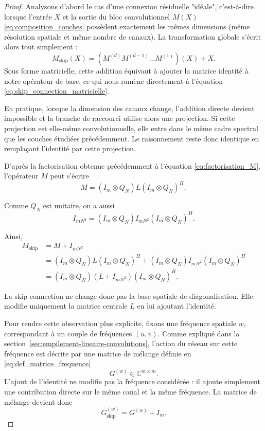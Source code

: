 \begin{proof}

Analysons d'abord le cas d'une connexion résiduelle "idéale", c'est-à-dire lorsque l'entrée $X$ et la sortie 
du bloc convolutionnel $M(X)$ \eqref{eq:composition_couches} possèdent exactement les mêmes dimensions (même résolution spatiale et même nombre 
de canaux). La transformation globale s'écrit alors tout simplement :
$$
M_{\mathrm{skip}}(X) = (M^{(d)} M^{(d-1)} \dots M^{(1)})(X) + X.
$$
Sous forme matricielle, cette addition équivaut à ajouter la matrice identité à notre opérateur de base, 
ce qui nous ramène directement à l'équation \eqref{eq:skip_connection_matricielle}.

En pratique, lorsque la dimension des canaux change, l'addition directe devient impossible et la 
branche de raccourci utilise alors une projection. 
Si cette projection est elle-même convolutionnelle, elle entre dans le même cadre spectral que les couches
étudiées précédemment. Le raisonnement reste donc identique en remplaçant l'identité par cette projection.

D'après la factorisation obtenue précédemment à l'équation \eqref{eq:factorisation_M}, l'opérateur $M$ peut
s'écrire
\[
M = (I_m \otimes Q_N)L(I_m \otimes Q_N)^H,
\]

Comme $Q_N$ est unitaire, on a aussi
\[
I_{mN^2}
=
(I_m \otimes Q_N)I_{mN^2}(I_m \otimes Q_N)^H.
\]

Ainsi,
\begin{align*}
M_{\mathrm{skip}}
&= M + I_{mN^2} \\
&= (I_m \otimes Q_N)L(I_m \otimes Q_N)^H
+
(I_m \otimes Q_N)I_{mN^2}(I_m \otimes Q_N)^H \\
&= (I_m \otimes Q_N)(L + I_{mN^2})(I_m \otimes Q_N)^H.
\end{align*}

La skip connection ne change donc pas la base spatiale de diagonalisation. Elle modifie uniquement la matrice
centrale $L$ en lui ajoutant l'identité.

Pour rendre cette observation plus explicite, fixons une fréquence spatiale $w$, correspondant à un couple
de fréquences $(u,v)$. Comme expliqué dans la section~\ref{sec:empilement-lineaire-convolutions}, l'action
du réseau sur cette fréquence est décrite par une matrice de mélange définie en \eqref{eq:def_matrice_frequence}
\[
G^{(w)} \in \mathbb{C}^{m \times m}.
\]
L'ajout de l'identité ne modifie pas la fréquence considérée : il ajoute simplement une contribution directe
sur le même canal et la même fréquence. La matrice de mélange devient donc
\[
G_{\mathrm{skip}}^{(w)} = G^{(w)} + I_m.
\]


\end{proof}
